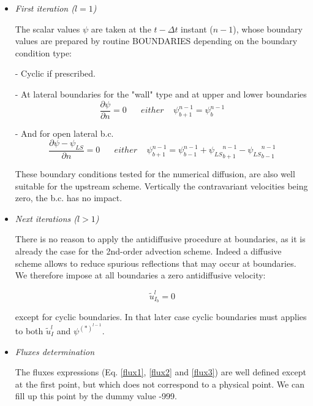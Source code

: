 \begin{itemize}
\item{\em {First iteration ($l=1$)}}

 The scalar values $\psi$ are taken at the $t-\Delta t$ instant ($n-1$),
whose boundary values are prepared by routine BOUNDARIES depending on the
boundary condition type:

- Cyclic if prescribed.

- At lateral boundaries for the "wall" type and at upper and lower boundaries
\begin{equation}
  \dfrac{\partial \psi }{\partial n } = 0 \;\;\;\;\;\; either \;\;\;\;
\psi^{n-1}_{b+1} = \psi^{n-1}_{b}
\end{equation}

- And for open lateral b.c.
\begin{equation}
  \dfrac{\partial \psi - \psi_{LS} }{\partial n } = 0 \;\;\;\;\;\; either \;\;\;\;
\psi^{n-1}_{b+1} = \psi^{n-1}_{b-1}
 + {\psi_{LS}}^{n-1}_{b+1} -{\psi_{LS}}^{n-1}_{b-1}
\end{equation}

\noindent These boundary conditions tested for the numerical diffusion, are also
well suitable for the upstream scheme. Vertically the contravariant velocities
being zero, the b.c. has no impact.

\item{\em {Next iterations ($l>1$)}}

 There is no reason to apply the antidiffusive procedure at boundaries, as it
is already the case for the 2nd-order advection scheme. Indeed a diffusive
scheme allows to reduce spurious reflections that may occur at boundaries.
We therefore impose at all boundaries a zero antidiffusive velocity:

\begin{equation}
\tilde{u}^{l}_{{I }_b} = 0
\end{equation}

\noindent except for cyclic boundaries. In that later case cyclic boundaries
must applies to both $\tilde{u}_I^{l}$ and $\psi^{(*)^{l-1}}$.

\item{\em {Fluxes determination}}

 The fluxes expressions (Eq. \ref{flux1}, \ref{flux2} and \ref{flux3}) are well defined except at the first
point, but which does not correspond to a physical point. We can fill up this
point by the dummy value -999.

\end{itemize}

